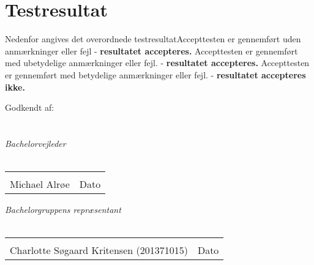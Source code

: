 \chapter{Testresultat}\label{Testrusultat}
Nedenfor angives det overordnede testresultat\newline
[   ] Accepttesten er gennemført uden anmærkninger eller fejl \newline
- \textbf{resultatet accepteres.} \newline
[   ] Accepttesten er gennemført med ubetydelige anmærkninger eller fejl. \newline
- \textbf{resultatet accepteres.} \newline
[   ] Accepttesten er gennemført med betydelige anmærkninger eller fejl. \newline
- \textbf{resultatet accepteres ikke.} \newline

Godkendt af: \newline
\\
\\
\\
{\large \textit{Bachelorvejleder}}
\\
\\

\noindent \begin{tabular}{ll}
	\makebox[3.0in]{\hrulefill} & \makebox[1.5in]{\hrulefill}\\
	Michael Alrøe & Dato\\[8ex]
\end{tabular}

{\large \textit{Bachelorgruppens repræsentant}}
\\
\\

\noindent \begin{tabular}{ll}
	\makebox[3.0in]{\hrulefill} & \makebox[1.5in]{\hrulefill}\\
	Charlotte Søgaard Kritensen (201371015) & Dato\\[8ex]
\end{tabular}
\newpage